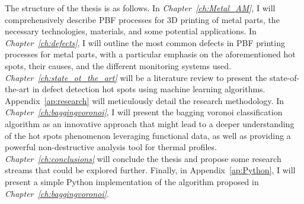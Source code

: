 The structure of the thesis is as follows. In \emph{Chapter~\ref{ch:Metal_AM}}, I will comprehensively describe PBF processes for 3D printing of metal parts, the necessary technologies, materials, and some potential applications. In \emph{Chapter~\ref{ch:defects}}, I will outline the most common defects in PBF printing processes for metal parts, with a particular emphasis on the aforementioned hot spots, their causes, and the different monitoring systems used. \emph{Chapter~\ref{ch:state_ot_the_art}} will be a literature review to present the state-of-the-art in defect detection hot spots using machine learning algorithms. Appendix~\ref{ap:research} will meticulously detail the research methodology. In \emph{Chapter~\ref{ch:baggingvoronoi}}, I will present the bagging voronoi classification algorithm as an innovative approach that might lead to a deeper understanding of the hot spots phenomenon leveraging functional data, as well as providing a powerful non-destructive analysis tool for thermal profiles. \emph{Chapter~\ref{ch:conclusions}} will conclude the thesis and propose some research streams that could be explored further. Finally, in Appendix~\ref{ap:Python}, I will present a simple Python \cite{python_software_foundation_python_2023} implementation of the algorithm proposed in \emph{Chapter~\ref{ch:baggingvoronoi}.}